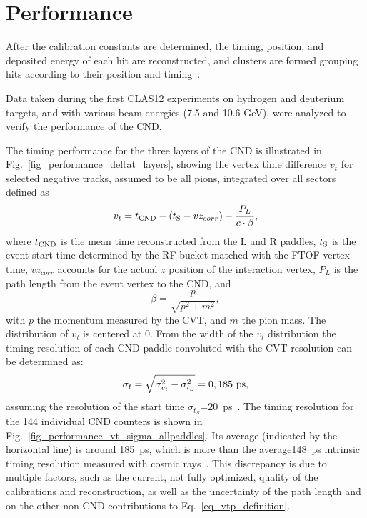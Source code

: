 \section{Performance}

After the calibration constants are determined, the timing, position, and deposited energy of each hit are reconstructed, and clusters are formed grouping hits according to their position and timing~\cite{recon-nim}.

Data taken during the first CLAS12 experiments on hydrogen and deuterium targets, and with various beam energies (7.5 and 10.6 GeV), were analyzed to verify the performance of the CND. 

The timing performance for the three layers of the CND is illustrated in Fig.~\ref{fig_performance_deltat_layers}, showing the vertex time difference $v_t$ for selected negative tracks, assumed to be all pions, integrated over all sectors defined as
\begin{equation}\label{eq_vtp_definition}
v_t=t_{\rm{CND}}-(t_{\rm{S}}-vz_{corr})-\frac{P_L}{c \cdot \beta} ,
\end{equation}
where $t_{\rm{CND}}$ is the mean time reconstructed from the L and R paddles, $t_{\rm{S}}$ is the event start time determined by the RF bucket matched with the FTOF vertex time, $vz_{corr}$ accounts for the actual $z$ position of the interaction vertex, $P_L$ is the path length from the event vertex to the CND, and
\begin{equation}\label{eq_beta_definition}
  \beta=\frac{p}{\sqrt{p^2+m^2}},
\end{equation}
with $p$ the momentum measured by the CVT, and $m$ the pion mass. 
The distribution of $v_t$ is centered at 0. From the width of the $v_t$ distribution the timing resolution of each CND paddle convoluted with the CVT resolution can be determined as:
\begin{equation}\label{eq_resolution}
\sigma_t=\sqrt{\sigma_{v_t}^2-\sigma_{t_{S}}^2}=0 , 185~\rm{ps}, 
\end{equation}
assuming the resolution of the start time $\sigma_{t_{S}}$=20~ps~\cite{ftof-nim}.
The timing resolution for the 144 individual CND counters is shown in Fig.~\ref{fig_performance_vt_sigma_allpaddles}. Its average (indicated by the horizontal line) is around 185~ps, which is more than the average148~ps  intrinsic timing resolution measured with cosmic rays~\cite{Niccolai:2018qzm}. This discrepancy is due to multiple factors, such as the current, not fully optimized, quality of the calibrations and reconstruction, as well as the uncertainty of the path length and on the other non-CND contributions to Eq.~\ref{eq_vtp_definition}.
